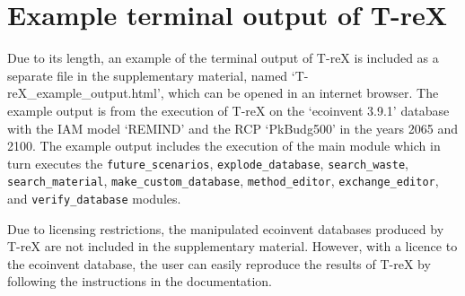 \documentclass{article}
\renewcommand{\texttt}[1]{{\ttfamily\small\nolinkurl{#1}}}
\begin{document}
\clearpage

\section{Example terminal output of T-reX}

Due to its length, an example of the terminal output of T-reX is included as a separate file in the supplementary material, named `T-reX\_example\_output.html', which can be opened in an internet browser. The example output is from the execution of T-reX on the `ecoinvent 3.9.1' database with the IAM model `REMIND' and the RCP `PkBudg500' in the years 2065 and 2100. The example output includes the execution of the main module which in turn executes the \texttt{future\_scenarios}, \texttt{explode\_database}, \texttt{search\_waste}, \texttt{search\_material}, \texttt{make\_custom\_database}, \texttt{method\_editor}, \texttt{exchange\_editor}, and \texttt{verify\_database} modules.

Due to licensing restrictions, the manipulated ecoinvent databases produced by T-reX are not included in the supplementary material. However, with a licence to the ecoinvent database, the user can easily reproduce the results of T-reX by following the instructions in the documentation.

\clearpage



\end{document}
